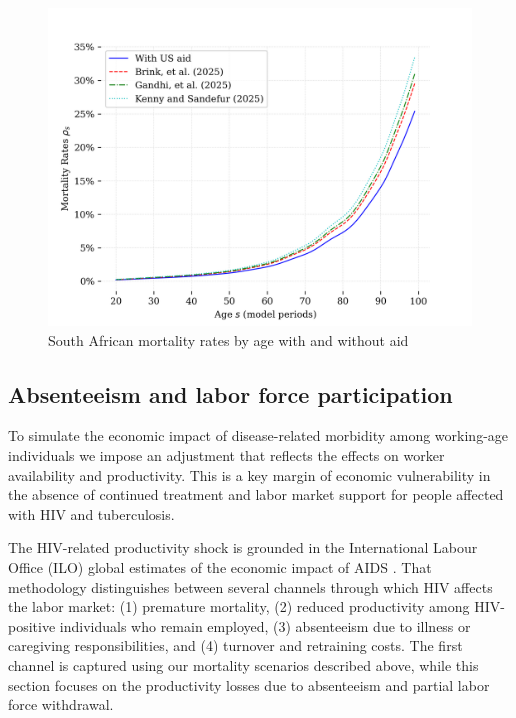 \documentclass[letterpaper,12pt]{article}
\theoremstyle{definition}
\begin{document}
\begin{spacing}{1.5}
\begin{figure}[H]
    \caption{South African mortality rates by age with and without aid}
    \label{fig:Mortality}
    \centering
    \includegraphics[scale=0.75]{./tables_figures/mortality_rates.png}
\end{figure}





\subsection{Absenteeism and labor force participation}

To simulate the economic impact of disease-related morbidity among working-age individuals we impose an adjustment that reflects the effects on worker availability and productivity. This is a key margin of economic vulnerability in the absence of continued treatment and labor market support for people affected with HIV and tuberculosis.

The HIV-related productivity shock is grounded in the International Labour Office (ILO) global estimates of the economic impact of AIDS \citep{ILO2018}. That methodology distinguishes between several channels through which HIV affects the labor market: (1) premature mortality, (2) reduced productivity among HIV-positive individuals who remain employed, (3) absenteeism due to illness or caregiving responsibilities, and (4) turnover and retraining costs. The first channel is captured using our mortality scenarios described above, while this section focuses on the productivity losses due to absenteeism and partial labor force withdrawal.


\end{spacing}
\end{document}
